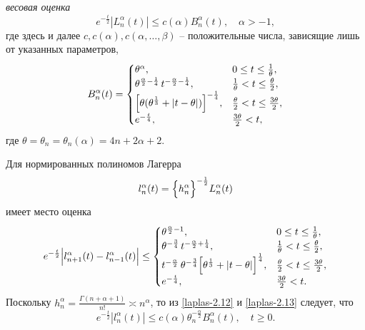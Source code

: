 \textit{весовая оценка} \cite{laplas-AskeyWaiger}
\begin{equation}\label{laplas-2.12}
e^{-\frac{t}{2}}|L_n^\alpha(t)| \le c(\alpha) B_n^\alpha(t), \quad \alpha>-1,
\end{equation}
где здесь и далее $c,c(\alpha),c(\alpha,\ldots,\beta)$ -- положительные числа, зависящие лишь от указанных параметров,
\begin{equation*}
B_n^\alpha(t)=
\begin{cases}
\theta^\alpha, &0 \le t \le \frac{1}{\theta},\\
\theta^{\frac{\alpha}{2} - \frac{1}{4}}\,t^{-\frac{\alpha}{2} - \frac{1}{4}}, & \frac{1}{\theta} < t \le \frac{\theta}{2},\\
\Bigl[
\theta(\theta^{\frac{1}{3}}+|t-\theta|)
\Bigr]^{-\frac{1}{4}}, & \frac{\theta}{2} < t \le \frac{3\theta}{2},\\
e^{-\frac{t}{4}}, &\frac{3\theta}{2}< t,
\end{cases}
\end{equation*}
где $\theta=\theta_n=\theta_n(\alpha)=4n+2\alpha+2$.

Для нормированных полиномов Лагерра
\begin{equation}\label{laplas-2.13}
l_n^\alpha(t)=
\Bigl\{h_n^\alpha \Bigr\}^{-\frac{1}{2}} L_n^\alpha(t)
\end{equation}
имеет место оценка \cite{laplas-AskeyWaiger}
\begin{equation}\label{laplas-2.14}
e^{-\frac{t}{2}}
\Bigl|
l_{n+1}^\alpha(t)-
l_{n-1}^\alpha(t)
\Bigr|\le
\begin{cases}
\theta^{\frac{\alpha}{2}-1}, &0 \le t \le \frac{1}{\theta},\\
\theta^{-\frac{3}{4}}\,t^{-\frac{\alpha}{2} + \frac{1}{4}}, & \frac{1}{\theta} < t \le \frac{\theta}{2},\\
t^{-\frac{\alpha}{2}}\,
\theta^{-\frac{3}{4}}
\Bigl[
\theta^{\frac{1}{3}}+|t-\theta|
\Bigr]^{\frac{1}{4}}, & \frac{\theta}{2} < t \le \frac{3\theta}{2},\\
e^{-\frac{t}{4}}, &\frac{3\theta}{2}< t.
\end{cases}
\end{equation}
Поскольку $h_n^\alpha=\frac{\Gamma(n+\alpha+1)}{n!} \asymp n^\alpha$, то из \eqref{laplas-2.12} и \eqref{laplas-2.13} следует, что
\begin{equation}\label{laplas-2.15}
e^{-\frac{t}{2}}
|l_n^\alpha(t)|\le
c(\alpha)\theta_n^{-\frac{\alpha}{2}}B_n^\alpha(t), \quad t \ge 0.
\end{equation}


